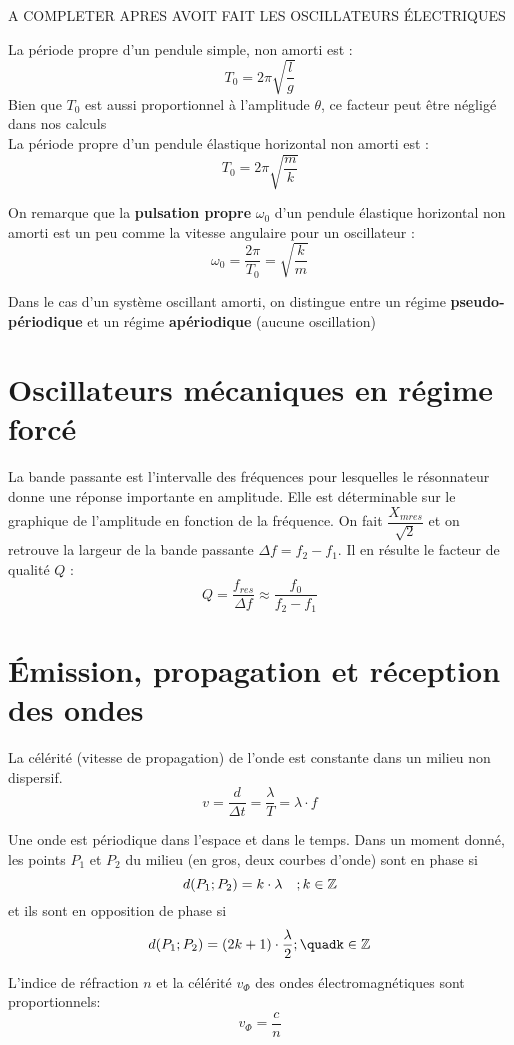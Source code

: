 \documentclass[../MAIN/main.tex]{subfiles}
\begin{document}
\begin{Definition}
A COMPLETER APRES AVOIT FAIT LES OSCILLATEURS ÉLECTRIQUES

La période propre d'un pendule simple, non amorti est :
$$T_{0}=2\pi\sqrt{\dfrac{l}{g}}$$
Bien que $T_{0}$ est aussi proportionnel à l'amplitude $\theta$, ce facteur peut être négligé dans nos calculs\\

La période propre d'un pendule élastique horizontal non amorti est :
$$T_{0}=2\pi\sqrt{\dfrac{m}{k}}$$

On remarque que la \textbf{pulsation propre} $\omega_{0}$ d'un pendule élastique horizontal non amorti est un peu comme la vitesse angulaire pour un oscillateur :
$$\omega_{0}=\dfrac{2\pi}{T_{0}}=\sqrt{\dfrac{k}{m}}$$

Dans le cas d'un système oscillant amorti, on distingue entre un régime \textbf{pseudo-périodique} et un régime \textbf{apériodique} (aucune oscillation)

\end{Definition}



\section{Oscillateurs mécaniques en régime forcé}

\begin{Definition}

La bande passante est l'intervalle des fréquences pour lesquelles le résonnateur donne une réponse importante en amplitude. Elle est déterminable sur le graphique de l'amplitude en fonction de la fréquence. On fait $\dfrac{X_{mres}}{\sqrt{2}}$ et on retrouve la largeur de la bande passante $\Delta f = f_{2} - f_{1}$. Il en résulte le facteur de qualité $Q$ :
$$Q=\dfrac{f_{res}}{\Delta f} \approx \dfrac{f_{0}}{f_{2}-f_{1}} $$

\end{Definition}



\section{Émission, propagation et réception des ondes}

\begin{Definition}

La célérité (vitesse de propagation) de l'onde est constante dans un milieu non dispersif.
$$v=\dfrac{d}{\Delta t} = \dfrac{\lambda}{T} = \lambda \cdot f$$

Une onde est périodique dans l'espace et dans le temps. Dans un moment donné, les points $P_{1}$ et $P_{2}$ du milieu (en gros, deux courbes d'onde) sont en phase si
$$d(P_{1};P_{2})=k\cdot\lambda\quad;k\in\mathbb{Z}$$
et ils sont en opposition de phase si
$$d(P_{1};P_{2})=(2k+1)\cdot\dfrac{\lambda}{2};\quadk\in\Z$$

L'indice de réfraction $n$ et la célérité $v_{\Phi}$ des ondes électromagnétiques sont proportionnels:
$$v_{\Phi} = \dfrac{c}{n}$$
\end{Definition}
\end{document}
